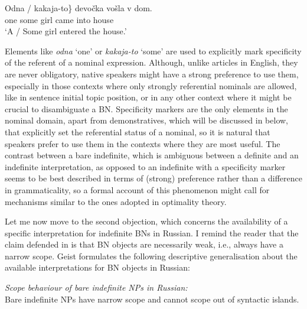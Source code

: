 \documentclass[output=paper,colorlinks,citecolor=brown]{langscibook}
\begin{document}
\ea
\gll \minsp{\{} Odna / kakaja-to\} devo\v{c}ka vo\v{s}la v dom. \\
 {} one {} some girl came into house\\
\glt `A / Some girl entered the house.'
\z

\noindent Elements like \textit{odna} `one' or \textit{kakaja-to} `some' are used to explicitly mark specificity of the referent of a nominal expression. Although, unlike articles in English, they are never obligatory, native speakers might have a strong preference to use them, especially in those contexts where only strongly referential nominals are allowed, like in sentence initial topic position, or in any other context where it might be crucial to disambiguate a BN. Specificity markers are the only elements in the nominal domain, apart from demonstratives, which will be discussed in  below, that explicitly set the referential status of a nominal, so it is natural that speakers prefer to use them in the contexts where they are most useful. The contrast between a bare indefinite, which is ambiguous between a definite and an indefinite interpretation, as opposed to an indefinite with a specificity marker seems to be best described in terms of (strong) preference rather than a difference in grammaticality, so a formal account of this phenomenon might call for mechanisms similar to the ones adopted in optimality theory. 


Let me now move to the second objection, which concerns the availability of a specific interpretation for indefinite BNs in Russian. I remind the reader that the claim defended in \citet{geist10} is that BN objects are necessarily weak, i.e., always have a narrow scope. Geist formulates the following descriptive generalisation about the available interpretations for BN objects in Russian: 

\eanoraggedright\label{scope} \textit{Scope behaviour of bare indefinite NPs in Russian:}\\
Bare indefinite NPs have narrow scope and cannot scope out of syntactic islands.\hfill\citep[][212, ex. (61)]{geist10}
\z
\end{document}
